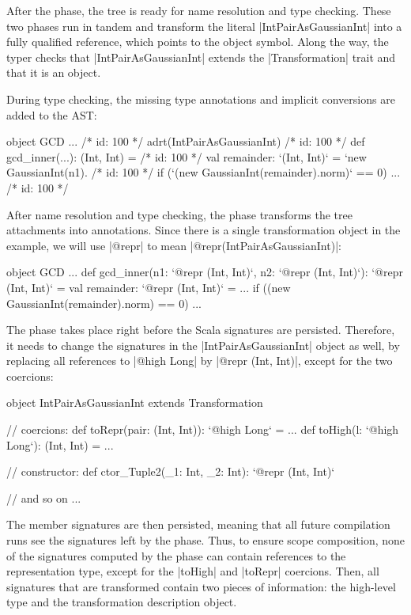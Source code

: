 After the \postparser{} phase, the tree is ready for name resolution and type checking. These two phases run in tandem and transform the literal |IntPairAsGaussianInt| into a fully qualified reference, which points to the object symbol. Along the way, the typer checks that |IntPairAsGaussianInt| extends the |Transformation| trait and that it is an object.

During type checking, the missing type annotations and implicit conversions are added to the AST:

\begin{lstlisting-nobreak}
object GCD {
  ...
  /* id: 100 */ adrt(IntPairAsGaussianInt) {}
  /* id: 100 */ def gcd_inner(...): (Int, Int) = {
  /* id: 100 */       val remainder: `(Int, Int)` = `new GaussianInt(n1).%
  /* id: 100 */       if (`(new GaussianInt(remainder).norm)` == 0) ...
  /* id: 100 */ }
}
\end{lstlisting-nobreak}

After name resolution and type checking, the \inject{} phase transforms the tree attachments into annotations. Since there is a single transformation object in the example, we will use |@repr| to mean |@repr(IntPairAsGaussianInt)|:

\begin{lstlisting-nobreak}
object GCD {
  ...
  def gcd_inner(n1: `@repr (Int, Int)`, n2: `@repr (Int, Int)`): `@repr (Int, Int)` = {
    val remainder: `@repr (Int, Int)` = ...
    if ((new GaussianInt(remainder).norm) == 0) ...
  }
}
\end{lstlisting-nobreak}

The \inject{} phase takes place right before the Scala signatures are persisted. Therefore, it needs to change the signatures in the |IntPairAsGaussianInt| object as well, by replacing all references to |@high Long| by |@repr (Int, Int)|, except for the two coercions:

\begin{lstlisting-nobreak}
object IntPairAsGaussianInt extends Transformation{
  // coercions:
  def toRepr(pair: (Int, Int)): `@high Long` = ...
  def toHigh(l: `@high Long`): (Int, Int) = ...

  // constructor:
  def ctor_Tuple2(_1: Int, _2: Int): `@repr (Int, Int)`

  // and so on ...
}
\end{lstlisting-nobreak}

The member signatures are then persisted, meaning that all future compilation runs see the signatures left by the \inject{} phase. Thus, to ensure scope composition, none of the signatures computed by the \inject{} phase can contain references to the representation type, except for the |toHigh| and |toRepr| coercions. Then, all signatures that are transformed contain two pieces of information: the high-level type and the transformation description object.

